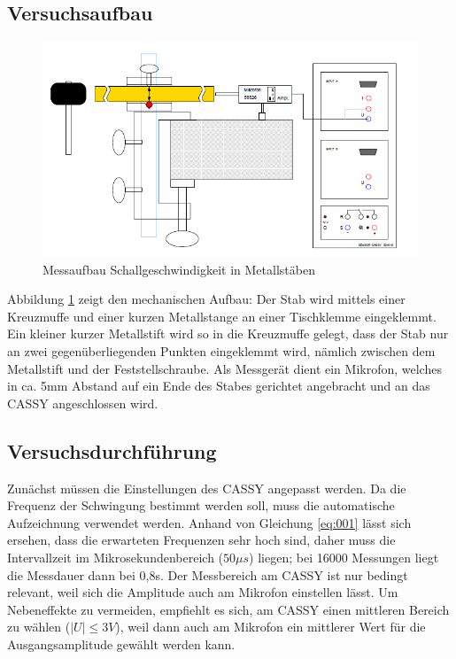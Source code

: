 \documentclass[12pt,a4paper]{article}
\begin{document}
\subsection{Versuchsaufbau}
\begin{figure}
\includegraphics[scale=1]{Bilder/AufbauMessungSchallgeschwindigkeitMetallstab.PNG}
\centering
\caption{Messaufbau Schallgeschwindigkeit in Metallstäben}
\label{StabAufbau}
\end{figure}
Abbildung \ref{StabAufbau} zeigt den mechanischen Aufbau: Der Stab wird mittels einer Kreuzmuffe und einer kurzen Metallstange an einer Tischklemme eingeklemmt. Ein kleiner kurzer Metallstift wird so in die Kreuzmuffe gelegt, dass der Stab nur an zwei gegenüberliegenden Punkten eingeklemmt wird, nämlich zwischen dem Metallstift und der Feststellschraube. Als Messgerät dient ein Mikrofon, welches in ca. 5mm Abstand auf ein Ende des Stabes gerichtet angebracht und an das CASSY angeschlossen wird. 
\subsection{Versuchsdurchführung}
Zunächst müssen die Einstellungen des CASSY angepasst werden. Da die Frequenz der Schwingung bestimmt werden soll, muss die automatische Aufzeichnung verwendet werden. Anhand von Gleichung \eqref{eq:001} lässt sich ersehen, dass die erwarteten Frequenzen sehr hoch sind, daher muss die Intervallzeit im Mikrosekundenbereich ($50 \mu s$) liegen; bei 16000 Messungen liegt die Messdauer dann bei 0,8s. Der Messbereich am CASSY ist nur bedingt relevant, weil sich die Amplitude auch am Mikrofon einstellen lässt. Um Nebeneffekte zu vermeiden, empfiehlt es sich, am CASSY einen mittleren Bereich zu wählen ($|U| \leq 3V$), weil dann auch am Mikrofon ein mittlerer Wert für die Ausgangsamplitude gewählt werden kann. \\
\end{document}
